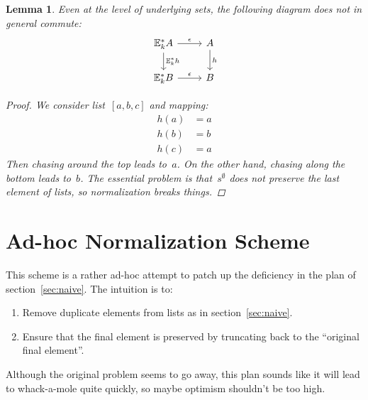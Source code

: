 \documentclass{article}
\theoremstyle{plain}
\newtheorem{lemma}[theorem]{Lemma}
\theoremstyle{definition}
\theoremstyle{remark}
\numberwithin{theorem}{section}
\begin{document}
\begin{lemma}
Even at the level of underlying sets, the following diagram does not in general commute:
\begin{equation*}
\begin{tikzcd}
\mathbb{E}^*_k A \ar[r, "\epsilon"] \ar[d, "\mathbb{E}^*_k h"] & A \ar[d, "h"]\\
\mathbb{E}^*_k B \ar[r, "\epsilon"] &  B
\end{tikzcd}
\end{equation*}
\begin{proof}
We consider list~$[a,b,c]$ and mapping:
\begin{align*}
    h(a) &= a\\
    h(b) &= b\\
    h(c) &= a
\end{align*}
Then chasing around the top leads to~$a$. On the other hand, chasing along the bottom leads to~$b$. The essential problem is that~$s^\emptyset$ does not preserve the last element of lists, so normalization breaks things.
\end{proof}

\end{lemma}

\section{Ad-hoc Normalization Scheme}
This scheme is a rather ad-hoc attempt to patch up the deficiency in the plan of section~\ref{sec:naive}. The intuition is to:
\begin{enumerate}
    \item Remove duplicate elements from lists as in section~\ref{sec:naive}.
    \item Ensure that the final element is preserved by truncating back to the ``original final element''.
\end{enumerate}
Although the original problem seems to go away, this plan sounds like it will lead to whack-a-mole quite quickly, so maybe optimism shouldn't be too high.
\end{document}
